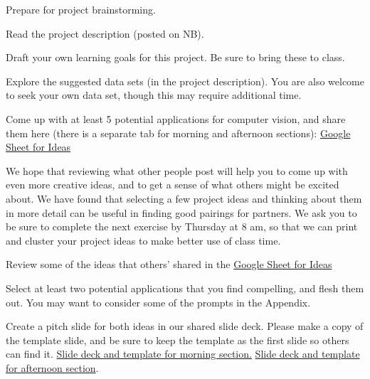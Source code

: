 \documentclass[assignment08_Solutions]{subfiles}
\begin{document}
\begin{exercise}
Prepare for project brainstorming.
\bes
\item Read the project description (posted on NB). 
\item Draft your own learning goals for this project. Be sure to bring these to class.
\item Explore the suggested data sets (in the project description). You are also welcome to seek your own data set, though this may require additional time.
\item Come up with at least 5 potential applications for computer vision, and share them here (there is a separate tab for morning and afternoon sections): \href{https://docs.google.com/spreadsheets/d/1hgZ_9C6l-iiWTn2BPQGgkwHQiP2nL0pPLvAcC5MrIPo/edit?usp=sharing}{Google Sheet for Ideas} 
\ees 
\end{exercise}
 
\vspace{1em}
We hope that reviewing what other people post will help you to come up with even more creative ideas, and to get a sense of what others might be excited about. We have found that selecting a few project ideas and thinking about them in more detail can be useful in finding good pairings for partners. We ask you to be sure to complete the next exercise by Thursday at 8 am, so that we can print and cluster your project ideas to make better use of class time.
\vspace{1em}
\begin{exercise}
\bes
\item Review some of the ideas that others' shared in the \href{https://docs.google.com/spreadsheets/d/1hgZ_9C6l-iiWTn2BPQGgkwHQiP2nL0pPLvAcC5MrIPo/edit?usp=sharing}{Google Sheet for Ideas} 
\item Select at least two potential applications that you find compelling, and flesh them out. You may want to consider some of the prompts in the Appendix.
\item Create a pitch slide for both ideas in our shared slide deck. Please make a copy of the template slide, and be sure to keep the template as the first slide so others can find it. \href{https://docs.google.com/presentation/d/1GgH_MhH1vHZ3FLmW3ikaDpZtWpBGUJTzSTuTktX49T8/edit?usp=sharing}{Slide deck and template for morning section.}  \href{https://docs.google.com/presentation/d/1IOXkjZY_5uL_XFaiCjZUL_GDlW7Ux3zv431i9tcxUR0/edit?usp=sharing}{Slide deck and template for afternoon section}.
\ees
\end{exercise}
\end{document}
